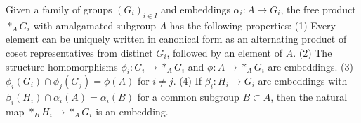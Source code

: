 Given a family of groups $(G_i)_{i \in I}$ and embeddings $\alpha_i: A \to G_i$, the free product $*_A G_i$ with amalgamated subgroup $A$ has the following properties:
(1) Every element can be uniquely written in canonical form as an alternating product of coset representatives from distinct $G_i$, followed by an element of $A$.
(2) The structure homomorphisms $\phi_i: G_i \to *_A G_i$ and $\phi: A \to *_A G_i$ are embeddings.
(3) $\phi_i(G_i) \cap \phi_j(G_j) = \phi(A)$ for $i \neq j$.
(4) If $\beta_i: H_i \to G_i$ are embeddings with $\beta_i(H_i) \cap \alpha_i(A) = \alpha_i(B)$ for a common subgroup $B \subset A$, then the natural map $*_B H_i \to *_A G_i$ is an embedding.